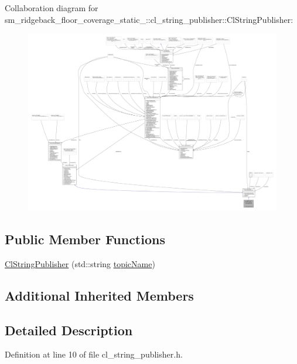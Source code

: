 Collaboration diagram for sm\+\_\+ridgeback\+\_\+floor\+\_\+coverage\+\_\+static\+\_\+:\+:cl\+\_\+string\+\_\+publisher\+:\+:Cl\+String\+Publisher\+:
\nopagebreak
\begin{figure}[H]
\begin{center}
\leavevmode
\includegraphics[width=350pt]{classsm__ridgeback__floor__coverage__static__1_1_1cl__string__publisher_1_1ClStringPublisher__coll__graph}
\end{center}
\end{figure}
\subsection*{Public Member Functions}
\begin{DoxyCompactItemize}
\item 
\hyperlink{classsm__ridgeback__floor__coverage__static__1_1_1cl__string__publisher_1_1ClStringPublisher_a6a83d7ed59446dea2e0ec9db46e18138}{Cl\+String\+Publisher} (std\+::string \hyperlink{classsmacc_1_1client__bases_1_1SmaccPublisherClient_a8b8d98aef9b3b3a441005d2cb17b4fcc}{topic\+Name})
\end{DoxyCompactItemize}
\subsection*{Additional Inherited Members}


\subsection{Detailed Description}


Definition at line 10 of file cl\+\_\+string\+\_\+publisher.\+h.



